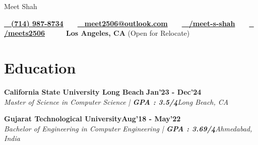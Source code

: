 \documentclass[letterpaper,10pt]{article}
\newcommand{\documentTitle}[2]{
  \begin{center}
    {\Huge\color{accentTitle} #1}
    \vspace{10pt}
   
    \vspace{2pt}
    \footnotesize{#2}
    \vspace{2pt}
  
  \end{center}
}
\newcommand{\tinysection}[1]{
  \phantomsection
  \addcontentsline{toc}{section}{#1}
  {\large{\bfseries\color{accentText}#1} {\color{accentLine} |}}
}
\newcommand{\heading}[2]{
  \hspace{10pt}#1\hfill#2\\
}
\newcommand{\headingBf}[2]{
  \heading{\textbf{#1}}{\textbf{#2}}
}
\newcommand{\headingIt}[2]{
  \heading{\textit{#1}}{\textit{#2}}
}
\newenvironment{resume_list}{
  \vspace{-7pt}
  \begin{itemize}[itemsep=-2px, parsep=1pt, leftmargin=30pt]
}{
  \end{itemize}
}
\begin{document}

\documentTitle{Meet Shah}{
    \href{tel:7149878734}{
      \raisebox{-0.05\height} \faPhone\ \, \textbf{(714) 987-8734}} ~  ~
    \href{mailto:meet2506@outlook.com}{
      \raisebox{-0.15\height} \faEnvelope\ \, \textbf{meet2506@outlook.com}} ~  ~
    \href{https://www.linkedin.com/in/meet-s-shah/}{
      \raisebox{-0.15\height} \faLinkedin\ \, \textbf{/meet-s-shah}} ~  ~
    \href{https://github.com/meets2506}{
      \raisebox{-0.15\height} \faGithub\ \, \textbf{/meets2506}} ~  ~
      \raisebox{-0.15\height} \faMapMarker\ \, \textbf{Los Angeles, CA} (Open for Relocate)}
  





  \section{Education}

  \headingBf{\faUniversity California State University Long Beach }{Jan'23 - Dec'24} %
  \headingIt{Master of Science in Computer Science | \textbf{GPA : 3.5/4}}{Long Beach, CA}

   \vspace{6pt}

 \headingBf{\faUniversity Gujarat Technological University}{Aug'18 - May'22} %
  \headingIt{Bachelor of Engineering in Computer Engineering | \textbf{GPA : 3.69/4}}{Ahmedabad, India}


\end{document}
